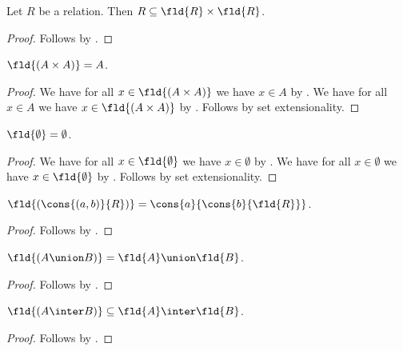 \begin{proposition}\label{relation_subseteq_times_fld}
    Let $R$ be a relation.
    Then $R\subseteq\fld{R}\times\fld{R}$.
\end{proposition}
\begin{proof}
    Follows by .
\end{proof}

\begin{proposition}\label{fld_universal}
    $\fld{(A\times A)} = A$.
\end{proposition}
\begin{proof}
    We have for all $x\in\fld{(A\times A)}$ we have $x\in A$
        by .
    We have for all $x\in A$ we have $x\in\fld{(A\times A)}$
        by .
    Follows by set extensionality.
\end{proof}

\begin{proposition}\label{fld_emptyset}
    $\fld{\emptyset} = \emptyset$.
\end{proposition}
\begin{proof}
    We have for all $x\in\fld{\emptyset}$ we have $x\in\emptyset$
        by .
    We have for all $x\in\emptyset$ we have $x\in\fld{\emptyset}$
        by .
    Follows by set extensionality.
\end{proof}

\begin{proposition}\label{fld_cons}
    $\fld{(\cons{(a,b)}{R})} = \cons{a}{\cons{b}{\fld{R}}}$.
\end{proposition}
\begin{proof}
    Follows by .
\end{proof}

\begin{proposition}\label{fld_union}
    $\fld{(A\union B)} = \fld{A}\union\fld{B}$.
\end{proposition}
\begin{proof}
    Follows by .
\end{proof}

\begin{proposition}\label{fld_inter}
    $\fld{(A\inter B)}\subseteq \fld{A}\inter\fld{B}$.
\end{proposition}
\begin{proof}
    Follows by .
\end{proof}

